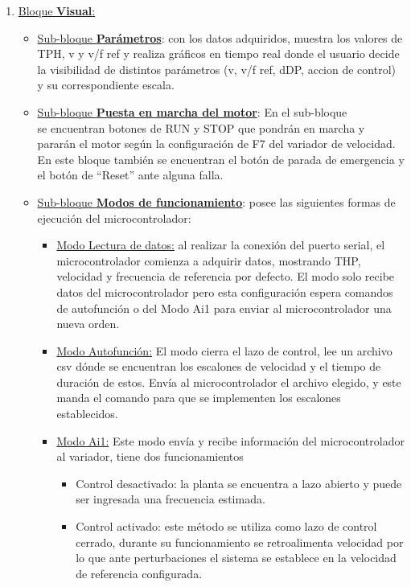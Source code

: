 \begin{enumerate}
\item \underline{ Bloque \textbf{Visual}: }
\begin{itemize}
\item \underline{Sub-bloque \textbf{Parámetros}}: con los datos adquiridos, muestra los valores de TPH, v y v/f ref y realiza gráficos en tiempo real donde el usuario decide la visibilidad de distintos parámetros (v, v/f ref, dDP, accion de control) y su correspondiente escala. 
\item \underline{Sub-bloque \textbf{Puesta en marcha del motor}}: En el sub-bloque \\  se encuentran botones de RUN y STOP que pondrán en marcha y pararán el motor según la configuración de F7 del variador de velocidad. En este bloque también se encuentran el botón de parada de emergencia y el botón de “Reset” ante alguna falla. 
\item \underline{Sub-bloque \textbf{Modos de funcionamiento}}: posee las siguientes formas de ejecución del microcontrolador:
\begin{itemize}
\item \underline{Modo Lectura de datos:} al realizar la conexión del puerto serial, el microcontrolador comienza a adquirir datos, mostrando THP, velocidad y frecuencia de referencia por defecto. El modo solo recibe datos del microcontrolador pero esta configuración espera comandos de autofunción o del Modo Ai1 para enviar al microcontrolador una nueva orden.
\item \underline{Modo Autofunción:} El modo cierra el lazo de control, lee un archivo csv dónde se encuentran los escalones de velocidad y el tiempo de duración de estos. Envía al microcontrolador el archivo elegido, y este manda el comando para que se implementen los escalones establecidos.
\item \underline{Modo Ai1:} Este modo envía y recibe información del microcontrolador al variador, tiene dos funcionamientos\\
\begin{itemize}
\item Control desactivado: la planta se encuentra a lazo abierto y puede ser ingresada una frecuencia estimada.\\
\item Control activado: este método se utiliza como lazo de control cerrado, durante su funcionamiento se retroalimenta velocidad por lo que ante perturbaciones el sistema se establece en la velocidad de referencia configurada.
\end{itemize}
\end{itemize}
\end{itemize}

\end{enumerate}


